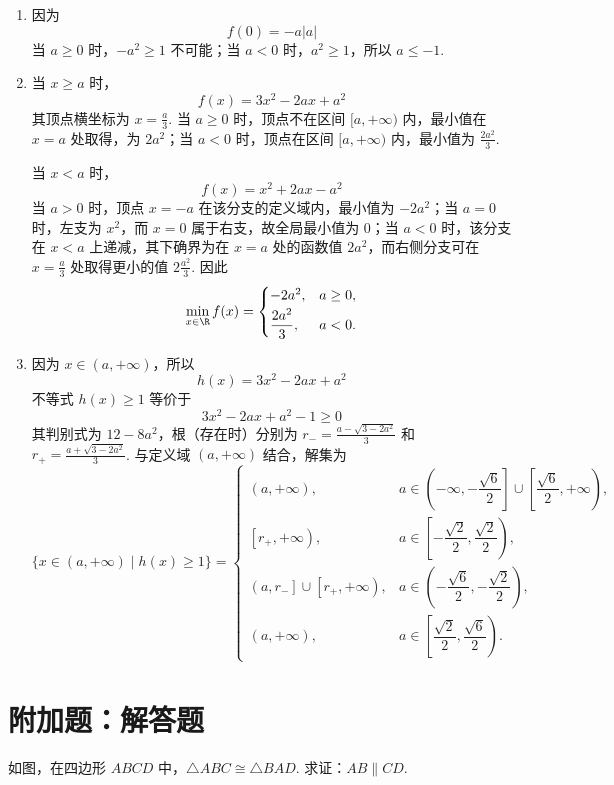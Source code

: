\begin{solution}
\begin{enumerate}
\item 因为
\[
f(0)=-a|a|
\]
当 \(a\ge0\) 时，\(-a^2\ge1\) 不可能；当 \(a<0\) 时，\(a^2\ge1\)，所以 \(a\le-1\).

\item 当 \(x\ge a\) 时，
\[
f(x)=3x^2-2ax+a^2
\]
其顶点横坐标为 \(x=\frac a3\). 当 \(a\ge0\) 时，顶点不在区间 \([a,+\infty)\) 内，最小值在 \(x=a\) 处取得，为 \(2a^2\)；当 \(a<0\) 时，顶点在区间 \([a,+\infty)\) 内，最小值为 \(\frac{2a^2}{3}\).

当 \(x<a\) 时，
\[
f(x)=x^2+2ax-a^2
\]
当 \(a>0\) 时，顶点 \(x=-a\) 在该分支的定义域内，最小值为 \(-2a^2\)；当 \(a=0\) 时，左支为 \(x^2\)，而 \(x=0\) 属于右支，故全局最小值为 \(0\)；当 \(a<0\) 时，该分支在 \(x<a\) 上递减，其下确界为在 \(x=a\) 处的函数值 \(2a^2\)，而右侧分支可在 \(x=\frac{a}{3}\) 处取得更小的值 \(2\frac{a^2}{3}\). 因此
\[
\min_{x\in\R}f(x)=
\begin{cases}
-2a^2,&a\ge0,\\[2pt]
\dfrac{2a^2}{3},&a<0.
\end{cases}
\]

\item 因为 \(x\in(a,+\infty)\)，所以
\[
h(x)=3x^2-2ax+a^2
\]
不等式 \(h(x)\ge1\) 等价于
\[
3x^2-2ax+a^2-1\ge0
\]
其判别式为 \(12-8a^2\)，根（存在时）分别为 \(r_-=\frac{a-\sqrt{3-2a^2}}{3}\) 和 \(r_+=\frac{a+\sqrt{3-2a^2}}{3}\).
与定义域 \((a,+\infty)\) 结合，解集为
\[
\{x\in(a,+\infty)\mid h(x)\ge1\}=
\begin{cases}
(a,+\infty),&a\in\left(-\infty,-\dfrac{\sqrt6}{2}\right]\cup\left[\dfrac{\sqrt6}{2},+\infty\right),\\[6pt]
\left[r_+,+\infty\right),&a\in\left[-\dfrac{\sqrt2}{2},\dfrac{\sqrt2}{2}\right),\\[6pt]
\left(a,r_-\right]\cup\left[r_+,+\infty\right),&a\in\left(-\dfrac{\sqrt6}{2},-\dfrac{\sqrt2}{2}\right),\\[6pt]
(a,+\infty),&a\in\left[\dfrac{\sqrt2}{2},\dfrac{\sqrt6}{2}\right).
\end{cases}
\]
\end{enumerate}
\end{solution}

\section{附加题：解答题}

\begin{problem}[A]
如图，在四边形 \(ABCD\) 中，\(\triangle ABC\cong\triangle BAD\). 求证：\(AB\parallel CD\).

\end{problem}

